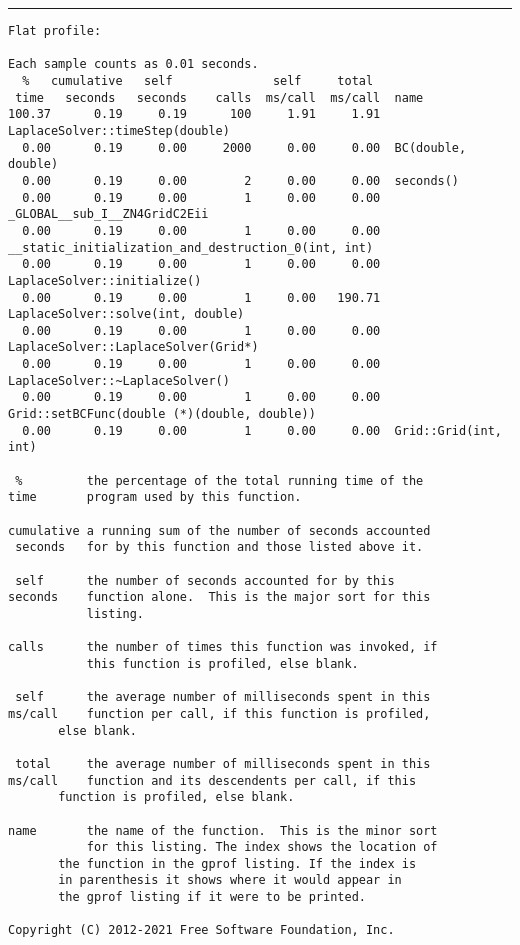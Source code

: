 \documentclass[a4paper,twosidep]{article}
\begin{document}
\noindent\rule{\textwidth}{0.5pt}
\begin{verbatim}
Flat profile:

Each sample counts as 0.01 seconds.
  %   cumulative   self              self     total
 time   seconds   seconds    calls  ms/call  ms/call  name
100.37      0.19     0.19      100     1.91     1.91  LaplaceSolver::timeStep(double)
  0.00      0.19     0.00     2000     0.00     0.00  BC(double, double)
  0.00      0.19     0.00        2     0.00     0.00  seconds()
  0.00      0.19     0.00        1     0.00     0.00  _GLOBAL__sub_I__ZN4GridC2Eii
  0.00      0.19     0.00        1     0.00     0.00  __static_initialization_and_destruction_0(int, int)
  0.00      0.19     0.00        1     0.00     0.00  LaplaceSolver::initialize()
  0.00      0.19     0.00        1     0.00   190.71  LaplaceSolver::solve(int, double)
  0.00      0.19     0.00        1     0.00     0.00  LaplaceSolver::LaplaceSolver(Grid*)
  0.00      0.19     0.00        1     0.00     0.00  LaplaceSolver::~LaplaceSolver()
  0.00      0.19     0.00        1     0.00     0.00  Grid::setBCFunc(double (*)(double, double))
  0.00      0.19     0.00        1     0.00     0.00  Grid::Grid(int, int)

 %         the percentage of the total running time of the
time       program used by this function.

cumulative a running sum of the number of seconds accounted
 seconds   for by this function and those listed above it.

 self      the number of seconds accounted for by this
seconds    function alone.  This is the major sort for this
           listing.

calls      the number of times this function was invoked, if
           this function is profiled, else blank.

 self      the average number of milliseconds spent in this
ms/call    function per call, if this function is profiled,
	   else blank.

 total     the average number of milliseconds spent in this
ms/call    function and its descendents per call, if this
	   function is profiled, else blank.

name       the name of the function.  This is the minor sort
           for this listing. The index shows the location of
	   the function in the gprof listing. If the index is
	   in parenthesis it shows where it would appear in
	   the gprof listing if it were to be printed.

Copyright (C) 2012-2021 Free Software Foundation, Inc.


\end{verbatim}
\end{document}
